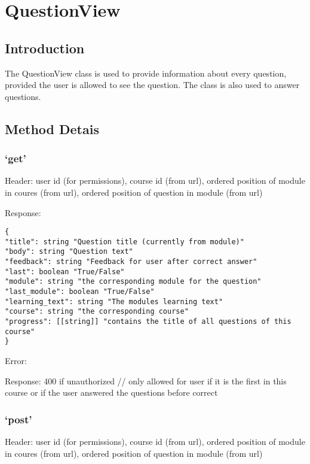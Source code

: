 \chapter*{QuestionView}

\section*{Introduction}\label{introduction}

The QuestionView class is used to provide information about every
question, provided the user is allowed to see the question. The class is
also used to answer questions.

\section*{Method Detais}\label{method-detais}

\subsection*{\texorpdfstring{`get'}{get}}\label{get}

Header: user id (for permissions), course id (from url), ordered
position of module in coures (from url), ordered position of question in
module (from url)

Response:

\begin{verbatim}
{
"title": string "Question title (currently from module)"
"body": string "Question text"
"feedback": string "Feedback for user after correct answer"
"last": boolean "True/False"
"module": string "the corresponding module for the question"
"last_module": boolean "True/False"
"learning_text": string "The modules learning text"
"course": string "the corresponding course"
"progress": [[string]] "contains the title of all questions of this course"
}
\end{verbatim}

Error:

Response: 400 if unauthorized // only allowed for user if it is the
first in this course or if the user answered the questions before
correct

\subsection*{\texorpdfstring{`post'}{post}}\label{post}

Header: user id (for permissions), course id (from url), ordered
position of module in coures (from url), ordered position of question in
module (from url)

